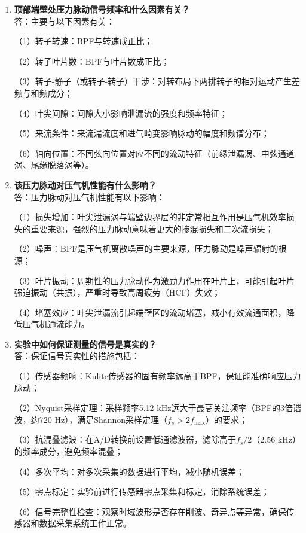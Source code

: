 \begin{enumerate}
    \item \textbf{顶部端壁处压力脉动信号频率和什么因素有关？}\\
    答：主要与以下因素有关：
    
    （1）转子转速：BPF与转速成正比；
    
    （2）转子叶片数：BPF与叶片数成正比；
    
    （3）转子-静子（或转子-转子）干涉：对转布局下两排转子的相对运动产生差频与和频成分；
    
    （4）叶尖间隙：间隙大小影响泄漏流的强度和频率特征；
    
    （5）来流条件：来流湍流度和进气畸变影响脉动的幅度和频谱分布；
    
    （6）轴向位置：不同弦向位置对应不同的流动特征（前缘泄漏涡、中弦通道涡、尾缘脱落涡等）。

    \item \textbf{该压力脉动对压气机性能有什么影响？}\\
    答：压力脉动对压气机性能有以下影响：
    
    （1）损失增加：叶尖泄漏涡与端壁边界层的非定常相互作用是压气机效率损失的重要来源，强烈的压力脉动意味着更大的掺混损失和二次流损失；
    
    （2）噪声：BPF是压气机离散噪声的主要来源，压力脉动是噪声辐射的根源；
    
    （3）叶片振动：周期性的压力脉动作为激励力作用在叶片上，可能引起叶片强迫振动（共振），严重时导致高周疲劳（HCF）失效；
    
    （4）堵塞效应：叶尖泄漏流引起端壁区的流动堵塞，减小有效流通面积，降低压气机通流能力。

    \item \textbf{实验中如何保证测量的信号是真实的？}\\
    答：保证信号真实性的措施包括：
    
    （1）传感器频响：Kulite传感器的固有频率远高于BPF，保证能准确响应压力脉动；
    
    （2）Nyquist采样定理：采样频率5.12 kHz远大于最高关注频率（BPF的3倍谐波，约720 Hz），满足Shannon采样定理（$f_s > 2f_{\max}$）的要求；
    
    （3）抗混叠滤波：在A/D转换前设置低通滤波器，滤除高于$f_s/2$（2.56 kHz）的频率成分，避免频率混叠；
    
    （4）多次平均：对多次采集的数据进行平均，减小随机误差；
    
    （5）零点标定：实验前进行传感器零点采集和标定，消除系统误差；
    
    （6）信号完整性检查：观察时域波形是否存在削波、奇异点等异常，确保传感器和数据采集系统工作正常。
\end{enumerate}

